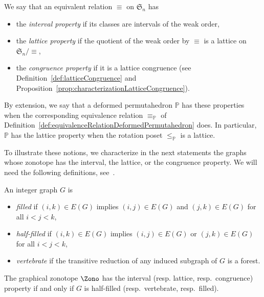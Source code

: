 \documentclass[AHL,Unicode,longabstracts,published]{cedram}
\newcommand{\f}[1]{\mathfrak{#1}}
\newcommand{\polytope}[1]{\mathds{#1}}
\begin{document}
\begin{defi}\label{def:intervalLatticeProperty}
We say that an equivalent relation $\equiv$ on $\f{S}_n$ has
\begin{itemize}
\item the
\emph{ interval property} if its classes are intervals of the weak order,
\item the
\emph{lattice property} if the quotient of the weak order by $\equiv$ is a lattice on~$\f{S}_n/{\equiv}$,
\item the
\emph{congruence property} if it is a lattice congruence (see Definition~\ref{def:latticeCongruence} and Proposition~\ref{prop:characterizationLatticeCongruence}).
\end{itemize}
By extension, we say that a deformed permutahedron $\polytope{P}$ has these properties when the corresponding equivalence relation $\equiv_\polytope{P}$ of Definition~\ref{def:equivalenceRelationDeformedPermutahedron} does. In particular, $\polytope{P}$ has the lattice property when the rotation poset $\le_\polytope{P}$ is a lattice.
\end{defi}

To illustrate these notions, we characterize in the next statements the graphs whose zonotope has the interval, the lattice, or the congruence property. We will need the following definitions, see~\cite{BarnardMcConville, Pilaud-acyclicReorientationLattices}.

\begin{defi}\label{def:filledEdges}
An integer graph $G$ is
\begin{itemize}
\item
\emph{filled} if ${(i,k) \in E(G)}$ implies $(i,j) \in E(G)$ and $(j,k) \in E(G)$ for all $i < j < k$,
\item
\emph{half-filled} if ${(i,k) \in E(G)}$ implies $(i,j) \in E(G)$ or $(j,k) \in E(G)$ for \linebreak all $i < j < k$,
\item
\emph{vertebrate} if the transitive reduction of any induced subgraph of $G$ is a forest.
\end{itemize}
\end{defi}

\begin{prop}\label{prop:latticePropertiesGraphicalZonotopes}
The graphical zonotope $\Zono$ has the interval (resp. lattice, resp.~congruence) property if and only if $G$ is half-filled (resp.~vertebrate, resp.~filled).
\end{prop}
\end{document}
